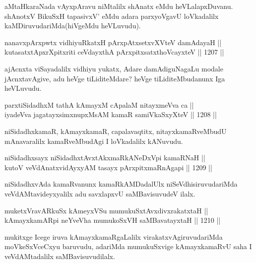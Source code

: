\begin{artha}
aMtaHkaraNada vAyxpAravu niMtalilx shAnatx eMdu heVLalapxDuvanu. shAnotxV BikuSxH tapasivxV' eMdu adara parxyoVgavU loVkadalilx kaMDiruvudariMda(hiVgeMdu heVLuvudu).
\end{artha}


\begin{shl}
nanavxpArxpwtx vidhiyuRkatxH pArxpAtxsetxvXVteV damAdayaH || \\
kutasatxtApxrXpitxriti ceVdayxthA pArxpitxsatxthoVcayxteV \hfill || 1207 ||  
\end{shl}

\begin{artha}
ajAcnxta viSayadalilx vidhiyu yukatx, Adare damAdiguNagaLu modale jAcnxtavAgive, adu heVge tiLiditeMdare? heVge tiLiditeMbudanunx Iga heVLuvudu.
\end{artha}

\begin{shl}
parxtiSidadhxM tathA kAmayxM cApalaM nitayxmeVva ca || \\
iyadeVva jagatayxsimxnupxMsAM kamaR samiVkaSxyXteV \hfill || 1208 ||  
\end{shl}

\begin{artha}
niSidadhxkamaR, kAmayxkamaR, capalavaqtitx, nitayxkamaRveMbudU mAnavaralilx kamaRveMbudAgi I loVkadalilx kANuvudu.
\end{artha}

\begin{shl}
niSidadhxsayx niSidadhxtAvxtAkxmaRkANeDxV\s pi kamaRNaH || \\
kutoV veVdAnatxvidAyxyAM tasayx pArxpitxmaRnAgapi \hfill || 1209 ||  
\end{shl}

\begin{artha}
niSidadhxvAda kamaRvanunx kamaRkAMDadalUlx niSeVdhisiruvudariMda veVdAMtavideyxyalilx adu savxlapxvU saMBavisuvudeV ilalx.
\end{artha}

\begin{shl}
muketxVravARkuSx kAmeyxVSu mumukuSxtAvxdivxrakatxtaH || \\
kAmayxkamARpi neYveVha mumukoSxVH saMBavatayxtaH \hfill || 1210 ||  
\end{shl}

\begin{artha}
mukitxge Icege iruva kAmayxkamaRgaLalilx virakatxvAgiruvudariMda moVkeSxVceCxyu baruvudu, adariMda mumukuSxvige kAmayxkamaRvU saha I veVdAMtadalilx saMBavisuvudilalx.
\end{artha}

